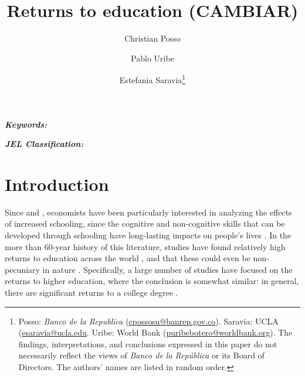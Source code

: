 \documentclass[12pt, a4paper]{article}
\begin{document}
\renewcommand{\BOthers}[1]{et al.\hbox{}}
\newcommand\fnote[1]{\captionsetup{font=small}\caption*{#1}}

\title{\Large \textbf{Returns to education (CAMBIAR)} \vspace{-0.1cm}}
\author{Christian Posso \and Pablo Uribe \and Estefania Saravia\thanks{Posso: \textit{Banco de la Republica} (\href{mailto:cpossosu@banrep.gov.co}{cpossosu@banrep.gov.co}). Saravia: UCLA (\href{mailto:esaravia@ucla.edu}{esaravia@ucla.edu}. Uribe: World Bank (\href{mailto:puribebotero@worldbank.org}{puribebotero@worldbank.org}). The findings, interpretations, and conclusions expressed in this paper do not necessarily reflect the views of \textit{Banco de la República} or its Board of Directors. The authors’ names are listed in random order.}}
\maketitle

\vspace{-0.5cm}
\begin{abstract}
    
\end{abstract}



\textit{\textbf{Keywords:}} 



\textit{\textbf{JEL Classification:}}

\vspace{.5cm}

\newpage
\section{Introduction}

Since \citet{becker1962investment} and \citet{mincer1974schooling}, economists have been particularly interested in analyzing the effects of increased schooling, since the cognitive and non-cognitive skills that can be developed through schooling have long-lasting impacts on people's lives \citep{heckman2006effects}. In the more than 60-year history of this literature, studies have found relatively high returns to education across the world \citep{psacharopoulos2018returns}, and that these could even be non-pecuniary in nature \citep{oreopoulos2011priceless}. Specifically, a large number of studies have focused on the returns to higher education, where the conclusion is somewhat similar: in general, there are significant returns to a college degree \citep{oreopoulos2013making}. 
\end{document}
